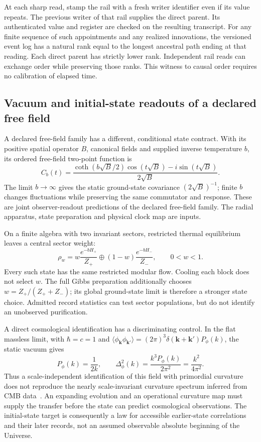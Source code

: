 \documentclass[11pt]{article}
\theoremstyle{remark}
\theoremstyle{plain}
\begin{document}
At each sharp read, stamp the rail with a fresh writer identifier even if
its value repeats. The previous writer of that rail supplies the direct
parent. Its authenticated value and register are checked on the resulting
transcript. For any finite sequence of such appointments and any realized
innovations, the versioned event log has a natural rank equal to the longest
ancestral path ending at that reading. Each direct parent has strictly lower
rank. Independent rail reads can exchange order while preserving those ranks.
This witness to causal order requires no calibration of elapsed time.

\subsection{Vacuum and initial-state readouts of a declared free field}

A declared free-field family has a different, conditional state contract.
With its positive spatial operator \(B\), canonical fields and supplied
inverse temperature \(b\), its ordered free-field two-point function is
\[
 C_b(t)=\frac{\coth(b\sqrt B/2)\cos(t\sqrt B)
                   -i\sin(t\sqrt B)}{2\sqrt B}.
\]
The limit \(b\to\infty\) gives the static ground-state covariance
\((2\sqrt B)^{-1}\); finite \(b\) changes fluctuations while preserving the
same commutator and response. These are joint observer-readout predictions
of the declared free-field family.
The radial apparatus, state preparation and physical clock map are inputs.

On a finite algebra with two invariant sectors, restricted thermal
equilibrium leaves a central sector weight:
\[
 \rho_w=w\frac{e^{-bH_+}}{Z_+}\oplus
        (1-w)\frac{e^{-bH_-}}{Z_-},\qquad 0<w<1.
\]
Every such state has the same restricted modular flow. Cooling each block
does not select \(w\). The full Gibbs preparation additionally chooses
\(w=Z_+/(Z_++Z_-)\); its global ground-state limit is therefore a stronger
state choice. Admitted record statistics can test sector populations,
but do not identify an unobserved purification.

A direct cosmological identification has a discriminating control.
In the flat massless limit, with \(\hbar=c=1\) and
\(\langle\phi_{\mathbf k}\phi_{\mathbf k'}\rangle
=(2\pi)^3\delta(\mathbf k+\mathbf k')P_\phi(k)\), the static vacuum gives
\[
 P_\phi(k)=\frac1{2k},\qquad
 \Delta_\phi^2(k)=\frac{k^3P_\phi(k)}{2\pi^2}
                  =\frac{k^2}{4\pi^2}.
\]
Thus a scale-independent identification of this field with primordial
curvature does not reproduce the nearly scale-invariant curvature spectrum
inferred from CMB data~\cite{planckinflation}. An expanding evolution and an operational curvature map must supply the
transfer before the state can predict cosmological observations. The
initial-state target is consequently a law for accessible earlier-state
correlations and their later records, not an assumed observable absolute
beginning of the Universe.
\end{document}
